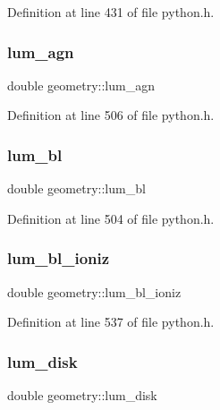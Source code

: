 Definition at line 431 of file python.\+h.

\mbox{\label{structgeometry_afc49d7aa9f0e9c5792dc2ba38a66a0ab}} 
\subsubsection{\texorpdfstring{lum\+\_\+agn}{lum\_agn}}
{\footnotesize\ttfamily double geometry\+::lum\+\_\+agn}



Definition at line 506 of file python.\+h.

\mbox{\label{structgeometry_aa2ea17f8b23e8e3785c3685c9261a8bf}} 
\subsubsection{\texorpdfstring{lum\+\_\+bl}{lum\_bl}}
{\footnotesize\ttfamily double geometry\+::lum\+\_\+bl}



Definition at line 504 of file python.\+h.

\mbox{\label{structgeometry_a1fb10589781d4853f13cebc8a3731de7}} 
\subsubsection{\texorpdfstring{lum\+\_\+bl\+\_\+ioniz}{lum\_bl\_ioniz}}
{\footnotesize\ttfamily double geometry\+::lum\+\_\+bl\+\_\+ioniz}



Definition at line 537 of file python.\+h.

\mbox{\label{structgeometry_aaf19a215b47f87b86755371bf9e1f6ce}} 
\subsubsection{\texorpdfstring{lum\+\_\+disk}{lum\_disk}}
{\footnotesize\ttfamily double geometry\+::lum\+\_\+disk}



